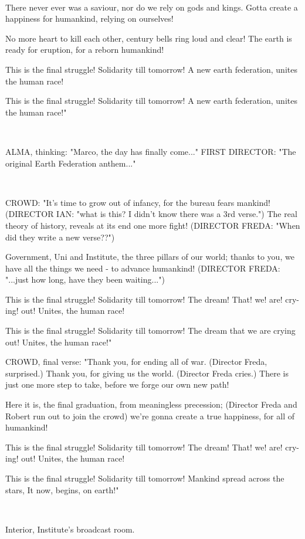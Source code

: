 \documentclass[11pt]{article}
\begin{document}
\ 

There never ever was a saviour,
nor do we rely on gods and kings.
Gotta create a happiness for humankind,
relying on ourselves!

No more heart to kill each other,
century bells ring loud and clear!
The earth is ready for eruption,
for a reborn humankind!

This is the final struggle! 
Solidarity till tomorrow!
A new earth federation,
unites the human race! 

This is the final struggle!
Solidarity till tomorrow!
A new earth federation,
unites the human race!"

\ 

ALMA, thinking: "Marco, the day has finally come..."
FIRST DIRECTOR: "The original Earth Federation anthem..."

\ 

CROWD: "It's time to grow out of infancy,
for the bureau fears mankind! (DIRECTOR IAN: "what is this? I didn't know there was a 3rd verse.")
The real theory of history, 
reveals at its end one more fight! (DIRECTOR FREDA: "When did they write a new verse??")

Government, Uni and Institute, 
the three pillars of our world;
thanks to you, we have all the things we need - 
to advance humankind! (DIRECTOR FREDA: "...just how long, have they been waiting...")

This is the final struggle!
Solidarity till tomorrow!
The dream! That! we! are! cry-ing! out!
Unites, the human race!

This is the final struggle!
Solidarity till tomorrow!
The dream that we are crying out!
Unites, the human race!"

CROWD, final verse: "Thank you, for ending all of war. (Director Freda, surprised.) Thank you, for giving us the world. (Director Freda cries.) There is just one more step to take, before we forge our own new path!

Here it is, the final graduation, from meaningless precession; (Director Freda and Robert run out to join the crowd) we're gonna create a true happiness, for all of humankind!

This is the final struggle!
Solidarity till tomorrow!
The dream! That! we! are! cry-ing! out!
Unites, the human race!

This is the final struggle!
Solidarity till tomorrow!
Mankind spread across the stars,
It now, begins, on earth!"

\ 

Interior, Institute's broadcast room.
\end{document}
